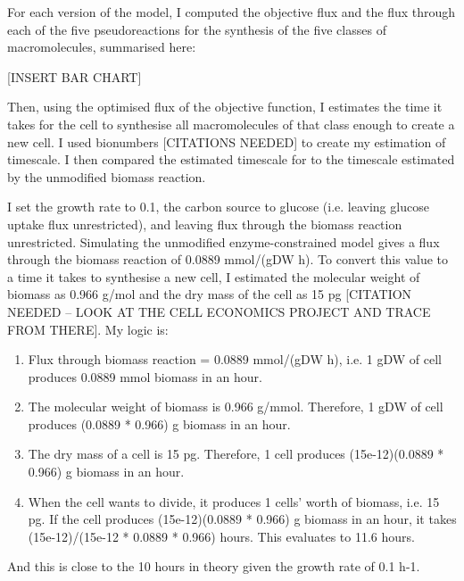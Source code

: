 For each version of the model, I computed the objective flux and the flux through each of the five pseudoreactions for the synthesis of the five classes of macromolecules, summarised here:

[INSERT BAR CHART]

Then, using the optimised flux of the objective function, I estimates the time it takes for the cell to synthesise all macromolecules of that class enough to create a new cell.
I used bionumbers [CITATIONS NEEDED] to create my estimation of timescale.
I then compared the estimated timescale for to the timescale estimated by the unmodified biomass reaction.

I set the growth rate to 0.1, the carbon source to glucose (i.e. leaving glucose uptake flux unrestricted), and leaving flux through the biomass reaction unrestricted.
Simulating the unmodified enzyme-constrained model gives a flux through the biomass reaction of 0.0889 mmol/(gDW h).
To convert this value to a time it takes to synthesise a new cell, I estimated the molecular weight of biomass as 0.966 g/mol \parencite{takhaveevTemporalSegregationBiosynthetic2023} and the dry mass of the cell as 15 pg [CITATION NEEDED -- LOOK AT THE CELL ECONOMICS PROJECT AND TRACE FROM THERE].
My logic is:
\begin{enumerate}
   \item Flux through biomass reaction = 0.0889 mmol/(gDW h), i.e. 1 gDW of cell produces 0.0889 mmol biomass in an hour.
   \item The molecular weight of biomass is 0.966 g/mmol.  Therefore, 1 gDW of cell produces (0.0889 * 0.966) g biomass in an hour.
   \item The dry mass of a cell is 15 pg.  Therefore, 1 cell produces (15e-12)(0.0889 * 0.966) g biomass in an hour.
   \item When the cell wants to divide, it produces 1 cells' worth of biomass, i.e. 15 pg.  If the cell produces (15e-12)(0.0889 * 0.966) g biomass in an hour, it takes (15e-12)/(15e-12 * 0.0889 * 0.966) hours.  This evaluates to 11.6 hours.
\end{enumerate}
And this is close to the 10 hours in theory given the growth rate of 0.1 h-1.

